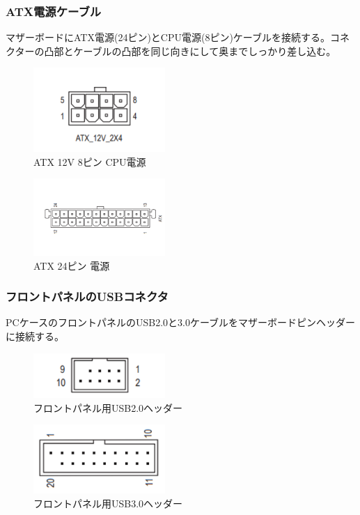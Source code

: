 \documentclass[10pt]{article}
\begin{document}
\subsubsection{ATX電源ケーブル}
\hspace{1cm}マザーボードにATX電源(24ピン)とCPU電源(8ピン)ケーブルを接続する。コネクターの凸部とケーブルの凸部を同じ向きにして奥までしっかり差し込む。




\begin{figure}[H]
	\centering
	\includegraphics[width=5cm]{6PIN.png}
	\caption{ATX 12V 8ピン CPU電源}
\end{figure}

\begin{figure}[H]
	\centering
	\includegraphics[width=5cm]{24PIN.png}
	\caption{ATX 24ピン 電源}
\end{figure}

\subsubsection{フロントパネルのUSBコネクタ}
\hspace{1cm}PCケースのフロントパネルのUSB2.0と3.0ケーブルをマザーボードピンヘッダーに接続する。

\begin{figure}[H]
	\centering
	\includegraphics[width=5cm]{USB2}
	\caption{フロントパネル用USB2.0ヘッダー}
\end{figure}
\begin{figure}[H]
	\centering
	\includegraphics[width=5cm]{USB3}
	\caption{フロントパネル用USB3.0ヘッダー}
\end{figure}
\end{document}
